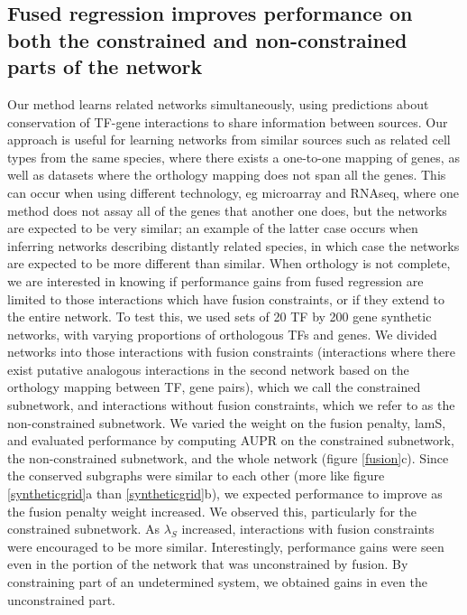 \documentclass[11pt]{article}
\begin{document}
\subsection{Fused regression improves performance on both the constrained and non-constrained parts of the network}
Our method learns related networks simultaneously, using predictions about conservation of TF-gene interactions to share information between sources. Our approach is useful for learning networks from similar sources such as related cell types from the same species, where there exists a one-to-one mapping of genes, as well as datasets where the orthology mapping does not span all the genes. This can occur when using different technology, eg microarray and RNAseq, where one method does not assay all of the genes that another one does, but the networks are expected to be very similar; an example of the latter case occurs when inferring networks describing distantly related species, in which case the networks are expected to be more different than similar. When orthology is not complete, we are interested in knowing if performance gains from fused regression are limited to those interactions which have fusion constraints, or if they extend to the entire network. To test this, we used sets of 20 TF by 200 gene synthetic networks, with varying proportions of orthologous TFs and genes. We divided networks into those interactions with fusion constraints (interactions where there exist putative analogous interactions in the second network based on the orthology mapping between TF, gene pairs), which we call the constrained subnetwork, and interactions without fusion constraints, which we refer to as the non-constrained subnetwork. We varied the weight on the fusion penalty, lamS, and evaluated performance by computing AUPR on the constrained subnetwork, the non-constrained subnetwork, and the whole network (figure \ref{fusion}c). Since the conserved subgraphs were similar to each other (more like figure \ref{syntheticgrid}a than \ref{syntheticgrid}b), we expected performance to improve as the fusion penalty weight increased. We observed this, particularly for the constrained subnetwork. As $\lambda_S$ increased, interactions with fusion constraints were encouraged to be more similar. Interestingly, performance gains were seen even in the portion of the network that was unconstrained by fusion. By constraining part of an undetermined system, we obtained gains in even the unconstrained part. 
\end{document}
